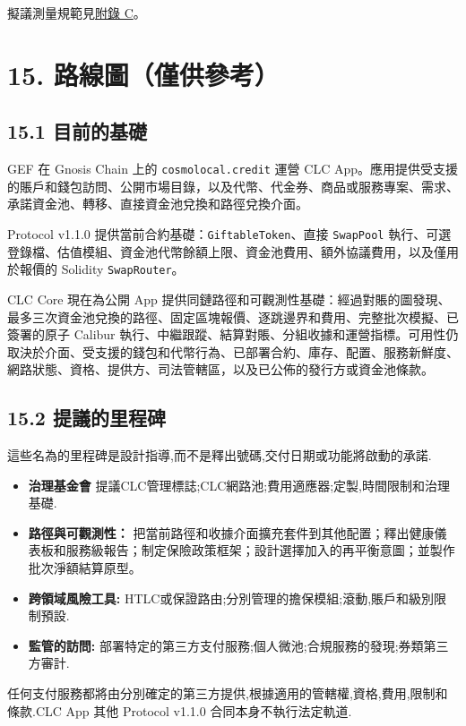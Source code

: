 \documentclass[11pt]{article}
\begin{document}
擬議測量規範見\href{https://docs.cosmolocal.credit/zh-Hant/white-paper/appendix-c-kpi-definitions}{附錄 C}。


\section*{15. 路線圖（僅供參考）}

\subsection*{15.1 目前的基礎}

GEF 在 Gnosis Chain 上的 \texttt{cosmolocal.credit} 運營 CLC App。應用提供受支援的賬戶和錢包訪問、公開市場目錄，以及代幣、代金券、商品或服務專案、需求、承諾資金池、轉移、直接資金池兌換和路徑兌換介面。

Protocol v1.1.0 提供當前合約基礎：\texttt{GiftableToken}、直接 \texttt{SwapPool} 執行、可選登錄檔、估值模組、資金池代幣餘額上限、資金池費用、額外協議費用，以及僅用於報價的 Solidity \texttt{SwapRouter}。

CLC Core 現在為公開 App 提供同鏈路徑和可觀測性基礎：經過對賬的圖發現、最多三次資金池兌換的路徑、固定區塊報價、逐跳邊界和費用、完整批次模擬、已簽署的原子 Calibur 執行、中繼跟蹤、結算對賬、分組收據和運營指標。可用性仍取決於介面、受支援的錢包和代幣行為、已部署合約、庫存、配置、服務新鮮度、網路狀態、資格、提供方、司法管轄區，以及已公佈的發行方或資金池條款。

\subsection*{15.2 提議的里程碑}

這些名為的里程碑是設計指導,而不是釋出號碼,交付日期或功能將啟動的承諾.

\begin{itemize}[leftmargin=*]
\item \textbf{治理基金會} 提議CLC管理標誌;CLC網路池;費用適應器;定製,時間限制和治理基礎.
\item \textbf{路徑與可觀測性：} 把當前路徑和收據介面擴充套件到其他配置；釋出健康儀表板和服務級報告；制定保險政策框架；設計選擇加入的再平衡意圖；並製作批次淨額結算原型。
\item \textbf{跨領域風險工具:} HTLC或保證路由;分別管理的擔保模組;滾動,賬戶和級別限制預設.
\item \textbf{監管的訪問:} 部署特定的第三方支付服務;個人微池;合規服務的發現;券類第三方審計.
\end{itemize}
任何支付服務都將由分別確定的第三方提供,根據適用的管轄權,資格,費用,限制和條款.CLC App 其他 Protocol v1.1.0 合同本身不執行法定軌道.
\end{document}
